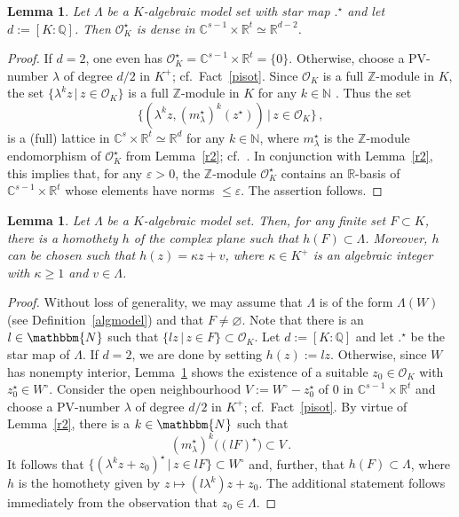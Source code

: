 \documentclass[a4paper]{amsart}
\newtheorem{lem}[theorem]{Lemma}
\theoremstyle{definition}
\numberwithin{equation}{section}
\numberwithin{theorem}{section}
\begin{document}
\begin{lem}\label{dense}
Let $\varLambda$ be a $K$-algebraic model set
with star map $.^{\star}$ and let $d:=[K:{\mathbb{Q}}]$. Then
$\mathcal{O}_{K}^{\star}$ is dense in ${\mathbb{C}}^{s-1}\times{\mathbb{R}}^t\simeq{\mathbb{R}}^{d-2}$.  
\end{lem}
\begin{proof}
If $d=2$, one even has $\mathcal{O}_{K}^{\star}={\mathbb{C}}^{s-1}\times{\mathbb{R}}^t=\{0\}$.
 Otherwise, choose a PV-number $\lambda$
of degree $d/2$ in $K^+$; cf.~Fact~\ref{pisot}. Since
$\mathcal{O}_{K}$ is a full ${\mathbb{Z}}$-module in $K$, the set
$\{\lambda^kz\,|\,z\in\mathcal{O}_{K}\}$ is a full
${\mathbb{Z}}$-module in $K$ for any $k\in{\mathbb{N}}$ . Thus the set $$\{(\lambda^k
z,(m_{\lambda}^{\star})^k(z^{\star}))\,|\,z\in\mathcal{O}_{K}\}\,,$$
is a (full) lattice in
${\mathbb{C}}^s\times{\mathbb{R}}^t\simeq{\mathbb{R}}^d$ for any $k\in{\mathbb{N}}$, where
$m_{\lambda}^{\star}$ is the ${\mathbb{Z}}$-module 
endomorphism of $\mathcal{O}_K^{\star}$ from Lemma~\ref{r2}; cf.~\cite[Ch.~2,
Sec.~3]{Bo}. In conjunction with Lemma~\ref{r2}, this implies that,
for any $\varepsilon>0$, the ${\mathbb{Z}}$-module $\mathcal{O}_{K}^{\star}$
contains an ${\mathbb{R}}$-basis of ${\mathbb{C}}^{s-1}\times{\mathbb{R}}^t$ whose elements have
norms $\leq\varepsilon$. The assertion follows.
\end{proof}

\begin{lem}\label{dilate}
Let $\varLambda$ be a $K$-algebraic model set.
 Then, for any finite set $F\subset K$, there is a homothety $h$ of
 the complex plane such that $h(F)\subset \varLambda$. Moreover, $h$
 can be chosen such that $h(z)=
\kappa z + v$, where $\kappa\in K^+$ is an algebraic integer with $\kappa\geq 1$ and
$v\in\varLambda$.
\end{lem}
\begin{proof}
Without loss of generality, we may assume that $\varLambda$ is of the
form $\varLambda(W)$ (see Definition~\ref{algmodel}) and that
$F\neq\varnothing$. Note that there is an $l\in
\mathbbm{N}$ such that $\{lz\,|\,z\in F\} \subset
\mathcal{O}_{K}$. Let $d:=[K:{\mathbb{Q}}]$ and let
$.^{\star}$ be the star map of $\varLambda$. If $d=2$, we are done by
 setting $h(z):=lz$. Otherwise, since $W$ has nonempty interior, Lemma~\ref{dense} shows the existence of a
suitable $z_{0}\in \mathcal{O}_{K}$ with $z_{0}^{\star}\in W^{\circ}$. Consider the open neighbourhood $V:= W^{\circ} -  z_{0}^{\star}$ of $0$ in
${\mathbb{C}}^{s-1}\times{\mathbb{R}}^t$ and choose a PV-number $\lambda$
of degree $d/2$ in $K^+$;
cf.~Fact~\ref{pisot}. By virtue of Lemma~\ref{r2}, there is a
$k\in\mathbbm{N}$ such
that $$(m_{\lambda}^{\star})^{k}\big((lF)^{\star}\big)\subset V\,.$$
It
follows that $\{(\lambda^{k} z + z_{0})^{\star}\, |\, z\in lF\}\subset
W^{\circ}$ and, further, that $h(F)\subset \varLambda$,
where $h$ is the homothety given by $z
\mapsto (l\lambda^{k}) z + z_{0}$. The additional statement follows
immediately from the observation that $z_0\in\varLambda$. 
\end{proof}   
\end{document}
